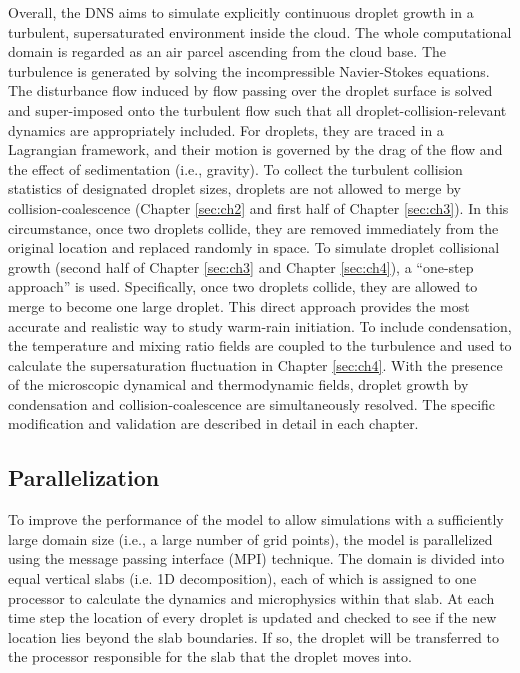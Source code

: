 Overall, the DNS aims to simulate explicitly continuous droplet growth in a turbulent, supersaturated environment inside the cloud. The whole computational domain is regarded as an air parcel ascending from the cloud base. The turbulence is generated by solving the incompressible Navier-Stokes equations. The disturbance flow induced by flow passing over the droplet surface is solved and super-imposed onto the turbulent flow such that all droplet-collision-relevant dynamics are appropriately included. For droplets, they are traced in a Lagrangian framework, and their motion is governed by the drag of the flow and the effect of sedimentation (i.e., gravity). To collect the turbulent collision statistics of designated droplet sizes, droplets are not allowed to merge by collision-coalescence (Chapter \ref{sec:ch2} and first half of Chapter \ref{sec:ch3}). In this circumstance, once two droplets collide, they are removed immediately from the original location and replaced randomly in space. To simulate droplet collisional growth (second half of Chapter \ref{sec:ch3} and Chapter \ref{sec:ch4}), a “one-step approach” is used. Specifically, once two droplets collide, they are allowed to merge to become one large droplet. This direct approach provides the most accurate and realistic way to study warm-rain initiation. To include condensation, the temperature and mixing ratio fields are coupled to the turbulence and used to calculate the supersaturation fluctuation in Chapter \ref{sec:ch4}. With the presence of the microscopic dynamical and thermodynamic fields, droplet growth by condensation and collision-coalescence are simultaneously resolved. The specific modification and validation are described in detail in each chapter.

\subsection{Parallelization}
To improve the performance of the model to allow simulations with a sufficiently large domain size (i.e., a large number of grid points), the model is parallelized using the message passing interface (MPI) technique. The domain is divided into equal vertical slabs (i.e. 1D decomposition), each of which is assigned to one processor to calculate the dynamics and microphysics within that slab. At each time step the location of every droplet is updated and checked to see if the new location lies beyond the slab boundaries. If so, the droplet will be transferred to the processor responsible for the slab that the droplet moves into. 




